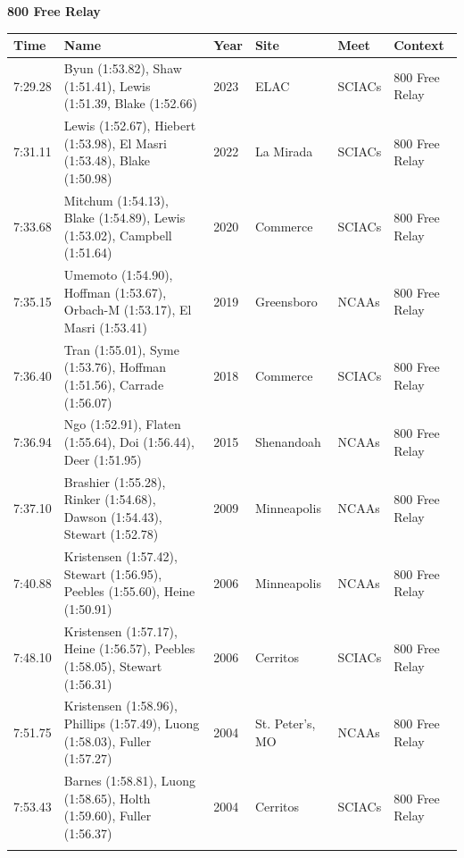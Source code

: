 \noindent\begin{minipage}[t]{0.98\textwidth}
\centering
\textbf{\textcolor{teamprimary}{800 Free Relay}}\par
\vspace{0.5em}
\centering
\small
\renewcommand{\arraystretch}{.75}
\setlength{\tabcolsep}{4pt}
\begin{tabular}{@{}p{2.0cm}p{3.2cm}p{1.2cm}p{2.0cm}p{2.0cm}p{2.5cm}@{}}
\toprule
\textbf{Time} & \textbf{Name} & \textbf{Year} & \textbf{Site} & \textbf{Meet} & \textbf{Context} \\
\midrule
7:29.28 & Byun (1:53.82), Shaw (1:51.41), Lewis (1:51.39, Blake (1:52.66) & 2023 & ELAC & SCIACs & 800 Free Relay \\
7:31.11 & Lewis (1:52.67), Hiebert (1:53.98), El Masri (1:53.48), Blake (1:50.98) & 2022 & La Mirada & SCIACs & 800 Free Relay \\
7:33.68 & Mitchum (1:54.13), Blake (1:54.89), Lewis (1:53.02), Campbell (1:51.64) & 2020 & Commerce & SCIACs & 800 Free Relay \\
7:35.15 & Umemoto (1:54.90), Hoffman (1:53.67), Orbach-M (1:53.17), El Masri (1:53.41) & 2019 & Greensboro & NCAAs & 800 Free Relay \\
7:36.40 & Tran (1:55.01), Syme (1:53.76), Hoffman (1:51.56), Carrade (1:56.07) & 2018 & Commerce & SCIACs & 800 Free Relay \\
7:36.94 & Ngo (1:52.91), Flaten (1:55.64), Doi (1:56.44), Deer (1:51.95) & 2015 & Shenandoah & NCAAs & 800 Free Relay \\
7:37.10 & Brashier (1:55.28), Rinker (1:54.68), Dawson (1:54.43), Stewart (1:52.78) & 2009 & Minneapolis & NCAAs & 800 Free Relay \\
7:40.88 & Kristensen (1:57.42), Stewart (1:56.95), Peebles (1:55.60), Heine (1:50.91) & 2006 & Minneapolis & NCAAs & 800 Free Relay \\
7:48.10 & Kristensen (1:57.17), Heine (1:56.57), Peebles (1:58.05), Stewart (1:56.31) & 2006 & Cerritos & SCIACs & 800 Free Relay \\
7:51.75 & Kristensen (1:58.96), Phillips (1:57.49), Luong (1:58.03), Fuller (1:57.27) & 2004 & St. Peter's, MO & NCAAs & 800 Free Relay \\
7:53.43 & Barnes (1:58.81), Luong (1:58.65), Holth (1:59.60), Fuller (1:56.37) & 2004 & Cerritos & SCIACs & 800 Free Relay \\
\bottomrule
\vspace{0.5em}
\end{tabular}
\end{minipage}
